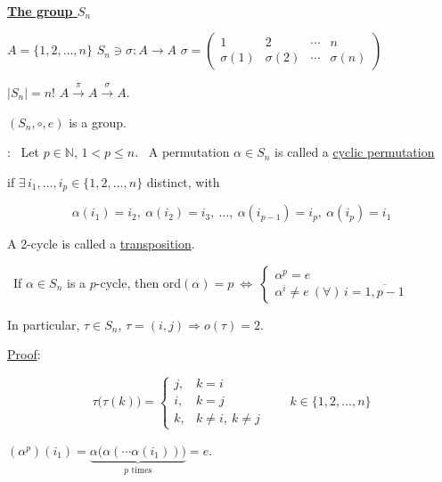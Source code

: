 \documentclass[12pt]{article}
\begin{document}
\begin{center}
\\[2pt]
\end{center}
\begin{flushright}
\end{flushright}

\bigskip
\noindent\underline{\textbf{The group $S_n$}}

\bigskip
\noindent $A=\{1,2,\ldots,n\}$ \quad $S_n \ni \sigma: A\to A$ \quad $\sigma = \begin{pmatrix}1&2&\cdots&n\\ \sigma(1)&\sigma(2)&\cdots&\sigma(n)\end{pmatrix}$

\noindent $|S_n|=n!$ \qquad $A\xrightarrow{\ \pi\ }A\xrightarrow{\ \sigma\ }A.$

\bigskip
\noindent $(S_n,\circ,e)$ is a group.

\bigskip
\noindent{}: \ Let $p\in\mathbb{N}$, $1<p\leq n$. \ A permutation $\alpha\in S_n$ is called a \underline{cyclic permutation}

\noindent if $\exists\,i_1,\ldots,i_p\in\{1,2,\ldots,n\}$ distinct, with

\[
\alpha(i_1)=i_2, \ \alpha(i_2)=i_3, \ \ldots, \ \alpha(i_{p-1})=i_p, \ \alpha(i_p)=i_1
\]

\bigskip
\noindent A 2-cycle is called a \underline{transposition}.

\bigskip
\noindent{} \ If $\alpha\in S_n$ is a $p$-cycle, then ord$(\alpha)=p \ \Leftrightarrow \ \begin{cases}\alpha^p=e\\ \alpha^i\neq e \ (\forall)\,i=\overline{1,p-1}\end{cases}$

\bigskip
\noindent In particular, $\tau\in S_n$, $\tau=(i,j) \Rightarrow o(\tau)=2$.

\bigskip
\noindent\underline{Proof}:

\[
\tau\big(\tau(k)\big)=
\begin{cases}
j, & k=i\\
i, & k=j\\
k, & k\neq i,\ k\neq j
\end{cases}
\qquad k\in\{1,2,\ldots,n\}
\]

\bigskip
\noindent $(\alpha^p)(i_1) = \underbrace{\alpha\big(\alpha(\cdots\alpha(i_1))\big)}_{p \text{ times}} = e.$
\end{document}
